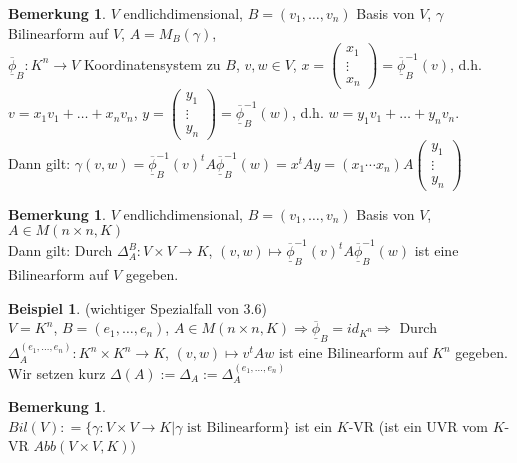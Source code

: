\documentclass[10pt,a4paper,numbers=endperiod]{scrartcl}
\theoremstyle{definition}
\newtheorem{bem}[satz]{Bemerkung}
\newtheorem{bsp}[satz]{Beispiel}
\begin{document}
\begin{bem}
	$V$ endlichdimensional, $B = (v_1, \ldots, v_n)$ Basis von $V$, $\gamma$ Bilinearform auf $V$, $A = M_B(\gamma)$,\\
	$\overline{\underline{\phi}}_B: K^n \rightarrow V$ Koordinatensystem zu $B$, $v,w \in V$, $x = \begin{pmatrix}
	x_1\\
	\vdots\\
	x_n
	\end{pmatrix} = \overline{\underline{\phi}}_B^{-1} (v)$, d.h. $v = x_1v_1+ \ldots +x_nv_n$, $y = \begin{pmatrix}
	y_1\\
	\vdots\\
	y_n
	\end{pmatrix} = \overline{\underline{\phi}}_B^{-1} (w)$, d.h. $w = y_1v_1+ \ldots + y_nv_n$.\\
	Dann gilt: $\gamma (v,w) = \overline{\underline{\phi}}_B^{-1}(v)^t A \overline{\underline{\phi}}_B^{-1} (w) = x^t A y = (x_1 \cdots x_n) A \begin{pmatrix}
	y_1\\
	\vdots\\ 
	y_n
	\end{pmatrix}$
\end{bem}

\begin{bem}
	$V$ endlichdimensional, $B = (v_1, \ldots, v_n)$ Basis von $V$, $A \in M(n \times n, K)$\\
	Dann gilt: Durch $\varDelta_A^B: V \times V \rightarrow K$, $(v,w) \mapsto \overline{\underline{\phi}}_B^{-1} (v) ^t A \overline{\underline{\phi}}_B^{-1} (w)$ ist eine Bilinearform auf $V$ gegeben. 
\end{bem}

\begin{bsp}
	(wichtiger Spezialfall von 3.6)\\
	$V = K^n$, $B = (e_1, \ldots, e_n)$, $A \in M(n \times n, K) \Rightarrow \overline{\underline{\phi}}_B = id_{K^n} \Rightarrow$ Durch $\varDelta_A^{(e_1, \ldots, e_n)} : K^n \times K^n \rightarrow K$, $(v, w) \mapsto v^t A w$ ist eine Bilinearform auf $K^n$ gegeben. Wir setzen kurz $\varDelta (A) := \varDelta_A :=  \varDelta_A^{(e_1, \ldots, e_n)}$
\end{bsp}

\begin{bem}
	$ $\\
	$Bil(V) : = \{\gamma : V \times V \rightarrow K | \gamma \text{ ist Bilinearform}\}$ ist ein $K$-VR (ist ein UVR vom $K$-VR $Abb(V \times V, K))$
\end{bem}
\end{document}
